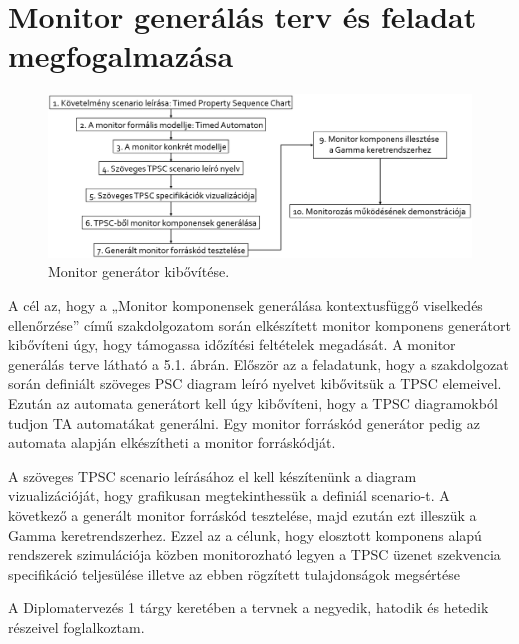 \chapter{Monitor generálás terv és feladat megfogalmazása}

\begin{figure}[!ht]
    \centering
    \includegraphics[width=150mm, keepaspectratio]{figures/generation_plan.png}
    \caption{Monitor generátor kibővítése.}
\end{figure}

A cél az, hogy a „Monitor komponensek generálása kontextusfüggő viselkedés ellenőrzése” című szakdolgozatom során elkészített monitor komponens generátort kibővíteni úgy, hogy támogassa időzítési feltételek megadását.
A monitor generálás terve látható a 5.1. ábrán.
Először az a feladatunk, hogy a szakdolgozat során definiált szöveges PSC diagram leíró nyelvet kibővitsük a TPSC elemeivel.
Ezután az automata generátort kell úgy kibővíteni, hogy a TPSC diagramokból tudjon TA automatákat generálni.
Egy monitor forráskód generátor pedig az automata alapján elkészítheti a monitor forráskódját.

A szöveges TPSC scenario leírásához el kell készítenünk a diagram vizualizációját, hogy grafikusan megtekinthessük a definiál scenario-t.
A következő a generált monitor forráskód tesztelése, majd ezután ezt illeszük a Gamma keretrendszerhez.
Ezzel az a célunk, hogy elosztott komponens alapú rendszerek szimulációja közben monitorozható legyen a TPSC üzenet szekvencia specifikáció teljesülése illetve az ebben rögzített tulajdonságok megsértése

A Diplomatervezés 1 tárgy keretében a tervnek a negyedik, hatodik és hetedik részeivel foglalkoztam.